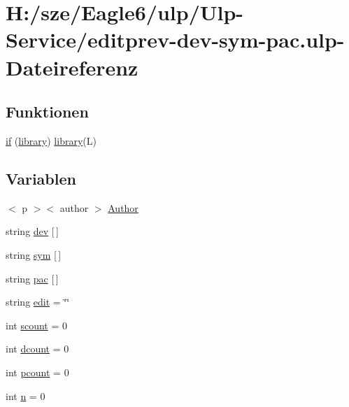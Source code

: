 \hypertarget{editprev-dev-sym-pac_8ulp}{}\section{H\+:/sze/\+Eagle6/ulp/\+Ulp-\/\+Service/editprev-\/dev-\/sym-\/pac.ulp-\/\+Dateireferenz}
\label{editprev-dev-sym-pac_8ulp}
\subsection*{Funktionen}
\begin{DoxyCompactItemize}
\item 
\hyperlink{editprev-dev-sym-pac_8ulp_ab0c49e750749de8998197e07e8e390bb}{if} (\hyperlink{uebersicht_8ulp_a825a5a33f9ea1598f17dac249716ae7e}{library}) \hyperlink{uebersicht_8ulp_a825a5a33f9ea1598f17dac249716ae7e}{library}(L)
\end{DoxyCompactItemize}
\subsection*{Variablen}
\begin{DoxyCompactItemize}
\item 
$<$ p $>$$<$ author $>$ \hyperlink{editprev-dev-sym-pac_8ulp_a4ef1368de21207760cab477f8d8edd5d}{Author}
\item 
string \hyperlink{editprev-dev-sym-pac_8ulp_af87dd7ae8e527b31308923149d6841e1}{dev} \mbox{[}$\,$\mbox{]}
\item 
string \hyperlink{editprev-dev-sym-pac_8ulp_a618376f21731b07801ed522f58f270ed}{sym} \mbox{[}$\,$\mbox{]}
\item 
string \hyperlink{editprev-dev-sym-pac_8ulp_aabdb88a547fddc24ea086330593761c2}{pac} \mbox{[}$\,$\mbox{]}
\item 
string \hyperlink{editprev-dev-sym-pac_8ulp_a03c320515aeefc0c276c51607ca8a5eb}{edit} = \char`\"{}\char`\"{}
\item 
int \hyperlink{editprev-dev-sym-pac_8ulp_a7ad37c8d993b00d12609dd9ae98ec650}{scount} = 0
\item 
int \hyperlink{editprev-dev-sym-pac_8ulp_a3c64e8145810cca064d965e070d2b9ea}{dcount} = 0
\item 
int \hyperlink{editprev-dev-sym-pac_8ulp_a747fe457bac32c34b78b69f9bfefd6f3}{pcount} = 0
\item 
int \hyperlink{editprev-dev-sym-pac_8ulp_a76f11d9a0a47b94f72c2d0e77fb32240}{n} = 0
\end{DoxyCompactItemize}



